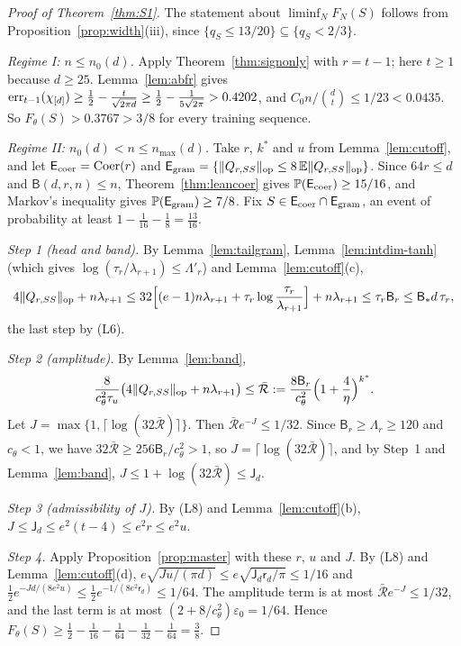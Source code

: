 \begin{proof}[Proof of Theorem~\ref{thm:S1}]
The statement about $\liminf_NF_N(S)$ follows from
Proposition~\ref{prop:width}(iii), since
$\{q_S\le13/20\}\subseteq\{q_S<2/3\}$.

\emph{Regime I: $n\le n_0(d)$.} Apply Theorem~\ref{thm:signonly} with
$r=t-1$; here $t\ge1$ because $d\ge25$. Lemma~\ref{lem:abfr} gives
$\operatorname{err}_{t-1}(\chi_{[d]})\ge\frac12-\frac t{\sqrt{2\pi d}}
\ge\frac12-\frac1{5\sqrt{2\pi}}>0.4202$, and $C_0n/\binom dt\le1/23<0.0435$.
So $F_\theta(S)>0.3767>3/8$ for every training sequence.

\emph{Regime II: $n_0(d)<n\le n_{\max}(d)$.} Take $r$, $k^*$ and $u$ from
Lemma~\ref{lem:cutoff}, and let $\mathsf E_{\rm coer}=\mathrm{Coer}(r)$ and
$\mathsf E_{\rm gram}=\{\|Q_{r,SS}\|_{\rm op}\le8\,\mathbb E\|Q_{r,SS}\|_{\rm op}\}$.
Since $64r\le d$ and $\mathsf B(d,r,n)\le n$,
Theorem~\ref{thm:leancoer} gives $\mathbb P(\mathsf E_{\rm coer})\ge15/16$, and
Markov's inequality gives $\mathbb P(\mathsf E_{\rm gram})\ge7/8$. Fix
$S\in\mathsf E_{\rm coer}\cap\mathsf E_{\rm gram}$, an event of probability
at least $1-\frac1{16}-\frac18=\frac{13}{16}$.

\emph{Step 1 (head and band).} By Lemma~\ref{lem:tailgram},
Lemma~\ref{lem:intdim-tanh} (which gives
$\log(\tau_r/\lambda_{r+1})\le\Lambda'_r$) and Lemma~\ref{lem:cutoff}(c),
\[
 4\|Q_{r,SS}\|_{\rm op}+n\lambda_{r+1}\le32\Bigl[(e-1)n\lambda_{r+1}
 +\tau_r\log\frac{\tau_r}{\lambda_{r+1}}\Bigr]+n\lambda_{r+1}
 \le\tau_r\mathsf B_r\le\mathsf B_*d\,\tau_r,
\]
the last step by (L6).

\emph{Step 2 (amplitude).} By Lemma~\ref{lem:band},
\[
 \frac8{c_\theta^2\tau_u}\bigl(4\|Q_{r,SS}\|_{\rm op}+n\lambda_{r+1}\bigr)
 \le\bar{\mathcal R}:=\frac{8\mathsf B_r}{c_\theta^2}\Bigl(1+\frac4\eta
 \Bigr)^{k^*}.
\]
Let $J=\max\{1,\lceil\log(32\bar{\mathcal R})\rceil\}$. Then
$\bar{\mathcal R}e^{-J}\le1/32$. Since $\mathsf B_r\ge\Lambda_r\ge120$ and
$c_\theta<1$, we have $32\bar{\mathcal R}\ge256\mathsf B_r/c_\theta^2>1$, so
$J=\lceil\log(32\bar{\mathcal R})\rceil$, and by Step~1 and
Lemma~\ref{lem:band}, $J\le1+\log(32\bar{\mathcal R})\le\mathsf J_d$.

\emph{Step 3 (admissibility of $J$).} By (L8) and
Lemma~\ref{lem:cutoff}(b), $J\le\mathsf J_d\le e^2(t-4)\le e^2r\le e^2u$.

\emph{Step 4.} Apply Proposition~\ref{prop:master} with these $r$, $u$ and
$J$. By (L8) and Lemma~\ref{lem:cutoff}(d),
$e\sqrt{Ju/(\pi d)}\le e\sqrt{\mathsf J_d\mathsf r_d/\pi}\le1/16$ and
$\frac12e^{-Jd/(8e^2u)}\le\frac12e^{-1/(8e^2\mathsf r_d)}\le1/64$. The
amplitude term is at most $\bar{\mathcal R}e^{-J}\le1/32$, and the last
term is at most $(2+8/c_\theta^2)\varepsilon_0=1/64$. Hence
$F_\theta(S)\ge\frac12-\frac1{16}-\frac1{64}-\frac1{32}-\frac1{64}=\frac38$.
\end{proof}


